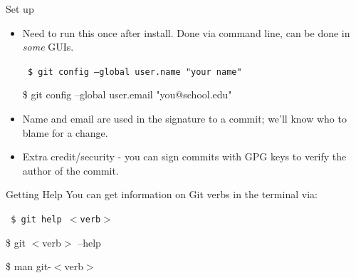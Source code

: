 \begin{frame}[t]{Set up}
  \begin{itemize}
    \item Need to run this once after install.  Done via command line, can be
      done in {\it some} GUIs.

  {\tt
    \$ git config --global user.name "your name"

    \$ git config --global user.email "you@school.edu" 
  } 

    \item Name and email are used in the signature to a commit; we'll know who
      to blame for a change.

    \item Extra credit/security - you can sign commits with GPG keys to verify
      the author of the commit.

  \end{itemize}

\end{frame}

\begin{frame}[t]{Getting Help}
  You can get information on Git verbs in the terminal via:

  {\tt
    \$ git help $<$verb$>$

    \$ git $<$verb$>$ --help

    \$ man git-$<$verb$>$ 
  } 
\end{frame}
